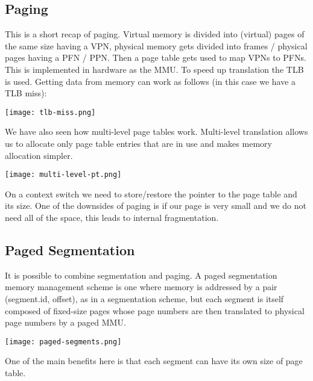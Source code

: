 \subsection{Paging}

This is a short recap of paging. Virtual memory is divided into (virtual) pages of the same size having a VPN, physical memory gets divided into frames / physical pages having a PFN / PPN. Then a page table gets used to map VPNs to PFNs. This is implemented in hardware as the MMU. To speed up translation the TLB is used. Getting data from memory can work as follows (in this case we have a TLB miss):
\begin{center}
	\texttt{[image: tlb-miss.png]}
\end{center}

We have also seen how multi-level page tables work. Multi-level translation allows us to allocate only page table entries that are in use and makes memory allocation simpler.
\begin{center}
	\texttt{[image: multi-level-pt.png]}
\end{center}

On a context switch we need to store/restore the pointer to the page table and its size. One of the downsides of paging is if our page is very small and we do not need all of the space, this leads to internal fragmentation.

\subsection{Paged Segmentation}

It is possible to combine segmentation and paging. A paged segmentation memory management scheme is one where memory is addressed by a pair (segment.id, offset), as in a segmentation scheme, but each segment is itself composed of fixed-size pages whose page numbers are then translated to physical page numbers by a paged MMU.
\begin{center}
	\texttt{[image: paged-segments.png]}
\end{center}

One of the main benefits here is that each segment can have its own size of page table.

